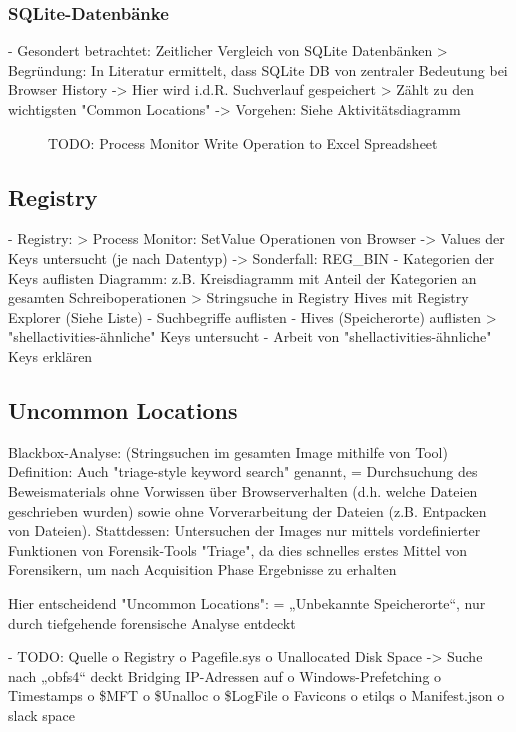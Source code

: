 \subsubsection*{SQLite-Datenbänke}
- Gesondert betrachtet: Zeitlicher Vergleich von SQLite Datenbänken
	> Begründung: In Literatur ermittelt, dass SQLite DB von zentraler Bedeutung bei Browser History -> Hier wird i.d.R. Suchverlauf gespeichert
	> Zählt zu den wichtigsten "Common Locations"
	-> Vorgehen: Siehe Aktivitätsdiagramm
\begin{figure}[h!]
	\centering
	\small
	\centerline{\resizebox{\linewidth}{!}{}}
	\caption{TODO: Process Monitor Write Operation to Excel Spreadsheet}
	\label{fig:jes}
\end{figure}

\subsection*{Registry}
- Registry:
	> Process Monitor: SetValue Operationen von Browser 
		-> Values der Keys untersucht (je nach Datentyp) -> Sonderfall: REG\_BIN
		- Kategorien der Keys auflisten
		Diagramm: z.B. Kreisdiagramm mit Anteil der Kategorien an gesamten Schreiboperationen
	> Stringsuche in Registry Hives mit Registry Explorer (Siehe Liste)
		- Suchbegriffe auflisten
		- Hives (Speicherorte) auflisten
	> "shellactivities-ähnliche" Keys untersucht
		- Arbeit von "shellactivities-ähnliche" Keys erklären

\subsection{Uncommon Locations}

Blackbox-Analyse: \cite{Bonetti.2014} (Stringsuchen im gesamten Image mithilfe von Tool) 
Definition: Auch "triage-style keyword search" \cite{Horsman.2019} genannt, = Durchsuchung des Beweismaterials ohne 
Vorwissen über Browserverhalten (d.h. welche Dateien geschrieben wurden) sowie ohne Vorverarbeitung der Dateien (z.B. Entpacken von Dateien).
Stattdessen: Untersuchen der Images nur mittels vordefinierter Funktionen von Forensik-Tools
"Triage", da dies schnelles erstes Mittel von Forensikern, um nach Acquisition Phase Ergebnisse zu erhalten

Hier entscheidend "Uncommon Locations":
	= „Unbekannte Speicherorte“, nur durch tiefgehende forensische Analyse entdeckt
	
	- TODO: Quelle
	o	Registry
	o	Pagefile.sys
	o	Unallocated Disk Space
	->	Suche nach „obfs4“ deckt Bridging IP-Adressen auf
	o	Windows-Prefetching
	o	Timestamps
	o	\$MFT
	o	\$Unalloc
	o	\$LogFile
	o	Favicons
	o	etilqs
	o	Manifest.json
	o	slack space
	
